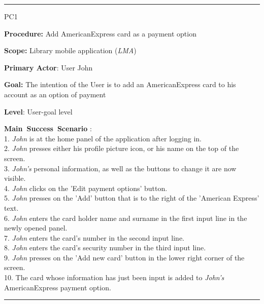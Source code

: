 \vspace{0.5cm}
\hrule
\begin{lyxlist}{PC1}
\small{
\item [\textbf{Procedure:}] Add AmericanExpress card as a payment option
\item [\textbf{Scope:}] Library mobile application (\emph{LMA})
\item [\textbf{Primary Actor}:] User John
\item [\textbf{Goal:}] The intention of the User is to add an AmericanExpress
card to his account as an option of payment
\item [\textbf{Level}:] User-goal level
\item [\textbf{Main~Success~Scenario}]:\\
1. \emph{John} is at the home panel of the application after logging in.\\
2. \emph{John} presses either his profile picture icon, or his name on the
top of the screen.\\
3. \emph{John's} personal information, as well as the buttons to change it are
now visible.\\
4. \emph{John} clicks on the 'Edit payment options' button.\\
5. \emph{John} presses on the 'Add' button that is to the right of the
'American Express' text.\\
6. \emph{John} enters the card holder name and surname in the first input line
in the newly opened panel. \\
7. \emph{John} enters the card's number in the second input line. \\
8. \emph{John} enters the card's security number in the third input line. \\
9. \emph{John} presses on the 'Add new card' button in the lower right corner of
the screen. \\
10. The card whose information has just been input is added to
\emph{John's} AmericanExpress payment option. \\

}

\end{lyxlist}
\hrule


